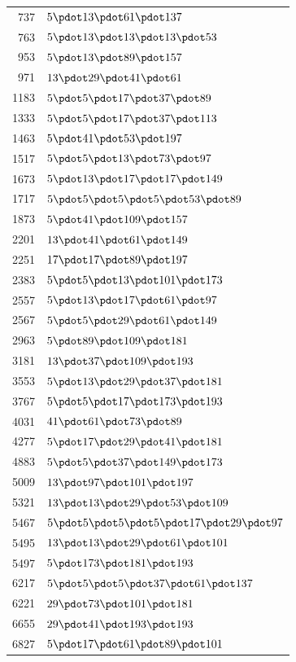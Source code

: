 \begin{longtable}{@{}r|l@{}}
737 & $5\pdot 13\pdot 61\pdot 137$\\
763 & $5\pdot 13\pdot 13\pdot 13\pdot 53$\\
953 & $5\pdot 13\pdot 89\pdot 157$\\
971 & $13\pdot 29\pdot 41\pdot 61$\\
1183 & $5\pdot 5\pdot 17\pdot 37\pdot 89$\\
1333 & $5\pdot 5\pdot 17\pdot 37\pdot 113$\\
1463 & $5\pdot 41\pdot 53\pdot 197$\\
1517 & $5\pdot 5\pdot 13\pdot 73\pdot 97$\\
1673 & $5\pdot 13\pdot 17\pdot 17\pdot 149$\\
1717 & $5\pdot 5\pdot 5\pdot 5\pdot 53\pdot 89$\\
1873 & $5\pdot 41\pdot 109\pdot 157$\\
2201 & $13\pdot 41\pdot 61\pdot 149$\\
2251 & $17\pdot 17\pdot 89\pdot 197$\\
2383 & $5\pdot 5\pdot 13\pdot 101\pdot 173$\\
2557 & $5\pdot 13\pdot 17\pdot 61\pdot 97$\\
2567 & $5\pdot 5\pdot 29\pdot 61\pdot 149$\\
2963 & $5\pdot 89\pdot 109\pdot 181$\\
3181 & $13\pdot 37\pdot 109\pdot 193$\\
3553 & $5\pdot 13\pdot 29\pdot 37\pdot 181$\\
3767 & $5\pdot 5\pdot 17\pdot 173\pdot 193$\\
4031 & $41\pdot 61\pdot 73\pdot 89$\\
4277 & $5\pdot 17\pdot 29\pdot 41\pdot 181$\\
4883 & $5\pdot 5\pdot 37\pdot 149\pdot 173$\\
5009 & $13\pdot 97\pdot 101\pdot 197$\\
5321 & $13\pdot 13\pdot 29\pdot 53\pdot 109$\\
5467 & $5\pdot 5\pdot 5\pdot 5\pdot 17\pdot 29\pdot 97$\\
5495 & $13\pdot 13\pdot 29\pdot 61\pdot 101$\\
5497 & $5\pdot 173\pdot 181\pdot 193$\\
6217 & $5\pdot 5\pdot 5\pdot 37\pdot 61\pdot 137$\\
6221 & $29\pdot 73\pdot 101\pdot 181$\\
6655 & $29\pdot 41\pdot 193\pdot 193$\\
6827 & $5\pdot 17\pdot 61\pdot 89\pdot 101$\\

\end{longtable}
